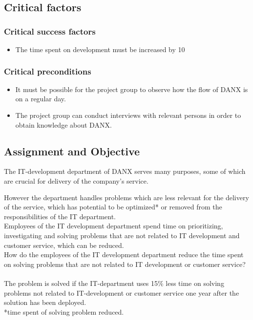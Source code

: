 \subsection{Critical factors}
\subsubsection{Critical success factors}
\begin{itemize}
	\item The time spent on development must be increased by 10%
	\end{itemize}

\subsubsection{Critical preconditions}
\begin{itemize}
	\item It must be possible for the project group to observe how the flow of DANX is on a regular day.
	\item The project group can conduct interviews with relevant persons in order to obtain knowledge about DANX.
	\end{itemize}

\subsection{Assignment and Objective}
The IT-development department of DANX serves many purposes, some of which are crucial for delivery of the company’s service.

However the department handles problems which are less relevant for the delivery of the service, which has potential to be optimized* or removed from the responsibilities of the IT department. \\

Employees of the IT development department spend time on prioritizing, investigating and solving problems that are not related to IT development and customer service, which can be reduced. \\

How do the employees of the IT development department reduce the time spent on solving problems that are not related to IT development or customer service?
\\ \\
The problem is solved if the IT-department uses 15\% less time on solving problems not related to IT-development or customer service one year after the solution has been deployed.
\\
\small{*time spent of solving problem reduced.}\\

